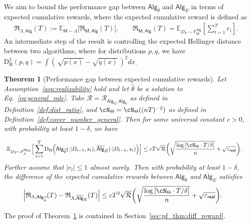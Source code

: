 \documentclass[10pt]{article}
\newtheorem{theorem}{Theorem}
\renewcommand{\epsilon}{\varepsilon}
\newcommand{\<}{\left\langle}
\renewcommand{\>}{\right\rangle}
\newcommand{\paren}[1]{{\left( #1 \right)}}
\newcommand{\brac}[1]{{\left[ #1 \right]}}
\newcommand{\E}{\mathbb{E}}
\renewcommand{\P}{\mathbb{P}}
\newcommand{\inst}{{\mathsf{M}}}
\newcommand{\HelDs}{{\mathrm{D}^2_{\mathrm{H}}}}
\newcommand{\HelD}{{\mathrm{D}_{\mathrm{H}}}}
\newcommand{\state}{{s}}
\newcommand{\reward}{{r}}
\newcommand{\totlen}{{T}}
\newcommand{\sAlg}{{\mathsf{Alg}}}
\newcommand{\osAlg}{\overline{\mathsf{Alg}}}
\newcommand{\dset}{{D}}
\newcommand{\Numobs}{{n}}
\newcommand{\Parspace}{{\Theta}}
\newcommand{\EstPar}{{\widehat{\theta}}}
\newcommand{\prior}{{\Lambda}}
\newcommand{\shortexp}{{E}}
\newcommand{\geneps}{{\epsilon}_{\sf real}}
\newcommand{\totreward}{{\mathfrak{R}}}
\newcommand{\distratio}{{\mathcal{R}}}
\begin{document}
We aim to bound the performance gap between $\sAlg_{\EstPar}$ and $\sAlg_\shortexp$ in terms of expected cumulative rewards, where the expected cumulative reward is defined as
\begin{align*}
\textstyle \totreward_{\prior,\sAlg}(\totlen)
:= \E_{\inst\sim\prior}\big[\totreward_{\inst,\sAlg}(\totlen) \big],~~~~~~~~~ \totreward_{\inst,\sAlg}(\totlen) = \E_{\dset_{\totlen} \sim\P^{\sAlg}_\inst}[\sum_{t=1}^\totlen \reward_t].
\end{align*}
An intermediate step of the result is controlling the expected Hellinger distance between two algorithms, where for distributions $p, q$, we have $\HelDs(p, q) = \int (\,\sqrt{p(x)} - \sqrt{q(x)} \,)^2 d x$.

\begin{theorem}[Performance gap between expected cumulative rewards]\label{thm:diff_reward} Let Assumption~\ref{asp:realizability} hold and let $\EstPar$ be a solution to Eq.~\eqref{eq:general_mle}. Take $\distratio = \distratio_{\osAlg_\shortexp,\sAlg_0}$ as defined in Definition~\ref{def:dist_ratio}, and $\cN_{\Parspace} = \cN_{\Parspace}((\Numobs\totlen)^{-2})$  as defined in Definition~\ref{def:cover_number_general}. Then for some universal constant $c>0$, with probability at least $1-\delta$, we have


\begin{align}\label{eqn:Hellinger-bound-main-theorem}
&~ \E_{\dset_\totlen\sim \P^{\sAlg_\shortexp}_\prior}\Big[ \sum_{t=1}^\totlen \HelD \paren{  \sAlg_{{\EstPar}}(\cdot|\dset_{t-1},\state_t ),\osAlg_{\shortexp}(\cdot|\dset_{t-1},\state_t )} \Big]
\le c {\totlen} \sqrt{\distratio}
\bigg(\sqrt{\frac{\log \brac{ \cN_{\Parspace} \cdot
 \totlen/\delta } }{n}} +  \sqrt{\geneps}\bigg).
\end{align}
Further assume that $|\reward_t| \leq 1$ almost surely. Then with probability at least $1-\delta$, the difference of the expected cumulative rewards between $\sAlg_\EstPar$ and $\osAlg_\shortexp$ satisfies
\begin{align}\label{eqn:reward-bound-main-theorem}
\Big|\totreward_{\prior,\sAlg_\EstPar}(\totlen)-\totreward_{\prior,\osAlg_\shortexp}(\totlen)\Big|
&\leq
c \totlen^2 \sqrt{\distratio} \bigg(\sqrt{\frac{\log \brac{ \cN_{\Parspace} \cdot
 \totlen/\delta } }{n}} +  \sqrt{\geneps}\bigg).
\end{align}
\end{theorem}

The proof of Theorem~\ref{thm:diff_reward} is contained in Section~\ref{sec:pf_thm:diff_reward}.
\end{document}
